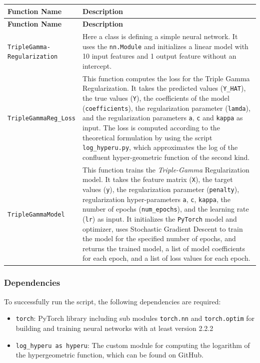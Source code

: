 \documentclass[12pt,a4paper]{article}
\begin{document}
\begin{longtable}{|p{4cm}|p{9cm}|}
\hline
\textbf{Function Name} & \textbf{Description} \\
\hline
\endfirsthead

\hline
\textbf{Function Name} & \textbf{Description} \\
\hline
\endhead

\hline
\endfoot

\hline
\endlastfoot

\makecell[l]{\texttt{TripleGamma-}\\\texttt{Regularization}} & Here a class is defining a simple neural network. It uses the \texttt{nn.Module} and initializes a linear model with 10 input features and 1 output feature without an intercept. \\
\hline
	\texttt{TripleGammaReg\_Loss} & This function computes the loss for the Triple Gamma Regularization. It takes the predicted values (\texttt{Y\_HAT}), the true values (\texttt{Y}), the coefficients of the model (\texttt{coefficients}), the regularization parameter (\texttt{lamda}), and the regularization parameters \texttt{a}, \texttt{c} and \texttt{kappa} as input. The loss is computed according to the theoretical formulation by using the script \texttt{log\_hyperu.py}, which approximates the log of the confluent hyper-geometric function of the second kind. \\
\hline
\texttt{TripleGammaModel} & This function trains the \textit{Triple-Gamma} Regularization model. It takes the feature matrix (\texttt{X}), the target values (\texttt{y}), the regularization parameter (\texttt{penalty}), regularization hyper-parameters \texttt{a}, \texttt{c}, \texttt{kappa}, the number of epochs (\texttt{num\_epochs}), and the learning rate (\texttt{lr}) as input. It initializes the \texttt{PyTorch} model and optimizer, uses Stochastic Gradient Descent to train the model for the specified number of epochs, and returns the trained model, a list of model coefficients for each epoch, and a list of loss values for each epoch.\\
\hline
\end{longtable}

\subsubsection*{Dependencies}
To successfully run the script, the following dependencies are required:
\begin{itemize}
    \item \texttt{torch}: PyTorch library including sub modules \texttt{torch.nn} and \texttt{torch.optim} for building and training neural networks with at least version 2.2.2
    \item \texttt{log\_hyperu as hyperu}: The custom module for computing the logarithm of the hypergeometric function, which can be found on GitHub.
\end{itemize}
\end{document}
